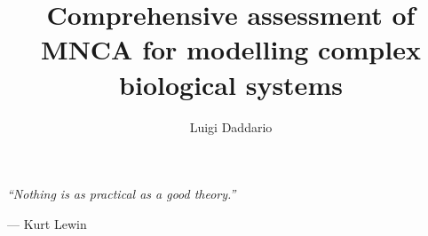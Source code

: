 \documentclass{styles/tthesis}
\title{Comprehensive assessment of MNCA for modelling complex biological systems}
\author{Luigi Daddario}
\begin{document}


\printfrontpage




\chapter*{\mbox{}}
\begin{flushright}
\thispagestyle{empty}
\null{}
{\it ``Nothing is as practical as a good theory.''}

\vspace{10pt}
--- Kurt Lewin
\null
\end{flushright}
\newpage




\tableofcontents
\listoffigures
\listoftables

\mainmatter









\backmatter




\end{document}
